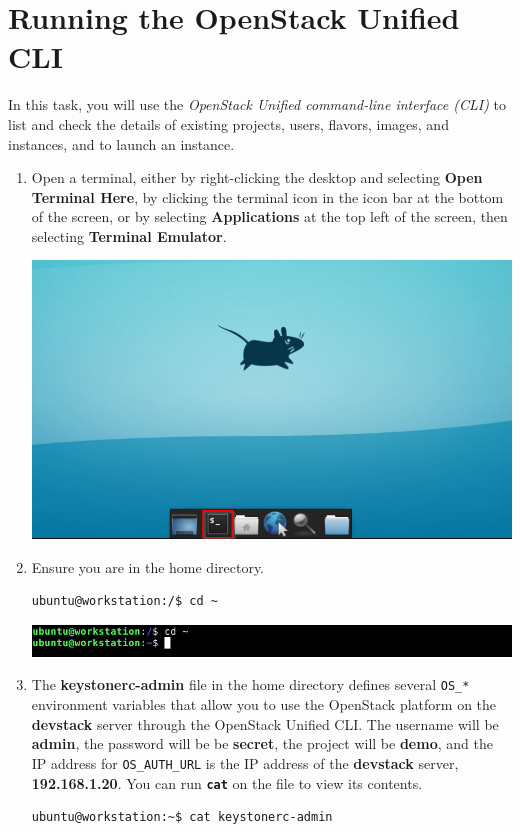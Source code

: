 \documentclass[letterpaper, 12pt]{article}
\begin{document}
\section{Running the OpenStack Unified CLI}
In this task, you will use the \textit{OpenStack Unified command-line interface (CLI)} to list and check the details of
existing projects, users, flavors, images, and instances, and to launch an instance.

\begin{enumerate}
    \item Open a terminal, either by right-clicking the desktop and selecting \textbf{Open Terminal Here}, by clicking
    the terminal icon in the icon bar at the bottom of the screen, or by selecting \textbf{Applications} at the top
    left of the screen, then selecting \textbf{Terminal Emulator}.

    \begin{center}
        \includegraphics[width=\linewidth]{images/part_2_step_1.png}
    \end{center}

    \item Ensure you are in the home directory.
\begin{lstlisting}
ubuntu@workstation:/$ cd ~
\end{lstlisting}

    \begin{center}
        \includegraphics[width=\linewidth]{images/part_2_step_2.png}
    \end{center}

    \item The \textbf{keystonerc-admin} file in the home directory defines several \texttt{OS\_*} environment variables
    that allow you to use the OpenStack platform on the \textbf{devstack} server through the OpenStack Unified
    CLI. The username will be \textbf{admin}, the password will be be \textbf{secret}, the project will be
    \textbf{demo}, and the IP address for \texttt{OS\_AUTH\_URL} is the IP address of the \textbf{devstack} server,
    \textbf{192.168.1.20}. You can run \textbf{\texttt{cat}} on the file to view its contents.
\begin{lstlisting}
ubuntu@workstation:~$ cat keystonerc-admin
\end{lstlisting}


\end{enumerate}
\end{document}
